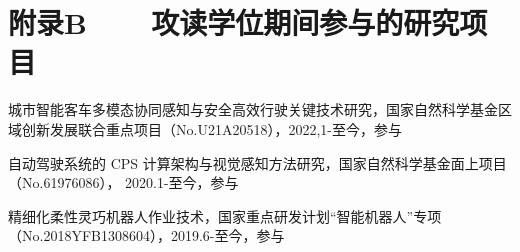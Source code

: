 \chapter*{附录B~~~~攻读学位期间参与的研究项目}
\setlength{\parindent}{0em}
\begin{publist}
\item 城市智能客车多模态协同感知与安全高效行驶关键技术研究，国家自然科学基金区域创新发展联合重点项目（No.U21A20518），2022,1-至今，参与
\item 自动驾驶系统的 CPS 计算架构与视觉感知方法研究，国家自然科学基金面上项目（No.61976086）， 2020.1-至今，参与
\item 精细化柔性灵巧机器人作业技术，国家重点研发计划“智能机器人”专项（No.2018YFB1308604），2019.6-至今，参与
\end{publist}